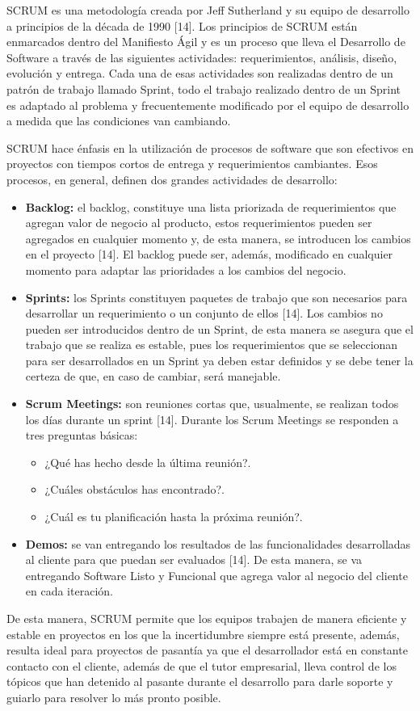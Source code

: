 \documentclass[a4paper, 12pt]{article}
\begin{document}
SCRUM es una metodología creada por Jeff Sutherland y su equipo de desarrollo a principios de la década de 1990 [14]. Los principios de SCRUM están enmarcados dentro del Manifiesto Ágil y es un proceso que lleva el Desarrollo de Software a través de las siguientes actividades: requerimientos, análisis, diseño, evolución y entrega. Cada una de esas actividades son realizadas dentro de un patrón de trabajo llamado Sprint, todo el trabajo realizado dentro de un Sprint es adaptado al problema y frecuentemente modificado por el equipo de desarrollo a medida que las condiciones van cambiando.

SCRUM hace énfasis en la utilización de procesos de software que son efectivos en proyectos con tiempos cortos de entrega y requerimientos cambiantes. Esos procesos, en general, definen dos grandes actividades de desarrollo:

\begin{itemize}
\item \textbf{Backlog:} el backlog, constituye una lista priorizada de requerimientos que agregan valor de negocio al producto, estos requerimientos pueden ser agregados en cualquier momento y, de esta manera, se introducen los cambios en el proyecto [14]. El backlog puede ser, además, modificado en cualquier momento para adaptar las prioridades a los cambios del negocio.
\item \textbf{Sprints:} los Sprints constituyen paquetes de trabajo que son necesarios para desarrollar un requerimiento o un conjunto de ellos [14]. Los cambios no pueden ser introducidos dentro de un Sprint, de esta manera se asegura que el trabajo que se realiza es estable, pues los requerimientos que se seleccionan para ser desarrollados en un Sprint ya deben estar definidos y se debe tener la certeza de que, en caso de cambiar, será manejable.
\item \textbf{Scrum Meetings:} son reuniones cortas que, usualmente, se realizan todos los días durante un sprint [14]. Durante los Scrum Meetings se responden a tres preguntas básicas:
\begin{itemize}
\item ¿Qué has hecho desde la última reunión?.
\item ¿Cuáles obstáculos has encontrado?.
\item ¿Cuál es tu planificación hasta la próxima reunión?.
\end{itemize}
\item \textbf{Demos:} se van entregando los resultados de las funcionalidades desarrolladas al cliente para que puedan ser evaluados [14]. De esta manera, se va entregando Software Listo y Funcional que agrega valor al negocio del cliente en cada iteración.
\end{itemize}

De esta manera, SCRUM permite que los equipos trabajen de manera eficiente y estable en proyectos en los que la incertidumbre siempre está presente, además, resulta ideal para proyectos de pasantía ya que el desarrollador está en constante contacto con el cliente, además de que el tutor empresarial, lleva control de los tópicos que han detenido al pasante durante el desarrollo para darle soporte y guiarlo para resolver lo más pronto posible.
\end{document}
